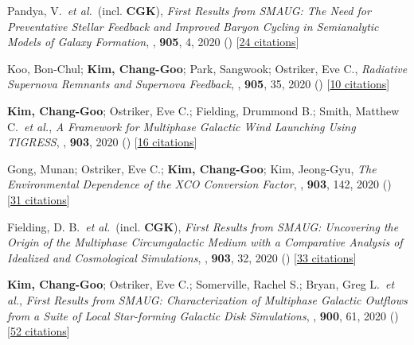\item[{30.}]Pandya, V.~\textit{et al.}~(incl. \textbf{CGK}), \textit{First Results from SMAUG: The Need for Preventative Stellar Feedback and Improved Baryon Cycling in Semianalytic Models of Galaxy Formation}, , \textbf{905}, 4, 2020 () [\href{http://adsabs.harvard.edu/abs/2020ApJ...905....4P}{24 citations}]

\item[{29.}]Koo, Bon-Chul; \textbf{Kim, Chang-Goo}; Park, Sangwook; Ostriker, Eve C., \textit{Radiative Supernova Remnants and Supernova Feedback}, , \textbf{905}, 35, 2020 () [\href{http://adsabs.harvard.edu/abs/2020ApJ...905...35K}{10 citations}]

\item[{28.}]\textbf{Kim, Chang-Goo}; Ostriker, Eve C.; Fielding, Drummond B.; Smith, Matthew C.~\textit{et al.}, \textit{A Framework for Multiphase Galactic Wind Launching Using TIGRESS}, , \textbf{903}, 2020 () [\href{http://adsabs.harvard.edu/abs/2020ApJ...903L..34K}{16 citations}]

\item[{27.}]Gong, Munan; Ostriker, Eve C.; \textbf{Kim, Chang-Goo}; Kim, Jeong-Gyu, \textit{The Environmental Dependence of the XCO Conversion Factor}, , \textbf{903}, 142, 2020 () [\href{http://adsabs.harvard.edu/abs/2020ApJ...903..142G}{31 citations}]

\item[{26.}]Fielding, D. B.~\textit{et al.}~(incl. \textbf{CGK}), \textit{First Results from SMAUG: Uncovering the Origin of the Multiphase Circumgalactic Medium with a Comparative Analysis of Idealized and Cosmological Simulations}, , \textbf{903}, 32, 2020 () [\href{http://adsabs.harvard.edu/abs/2020ApJ...903...32F}{33 citations}]

\item[{25.}]\textbf{Kim, Chang-Goo}; Ostriker, Eve C.; Somerville, Rachel S.; Bryan, Greg L.~\textit{et al.}, \textit{First Results from SMAUG: Characterization of Multiphase Galactic Outflows from a Suite of Local Star-forming Galactic Disk Simulations}, , \textbf{900}, 61, 2020 () [\href{http://adsabs.harvard.edu/abs/2020ApJ...900...61K}{52 citations}]

